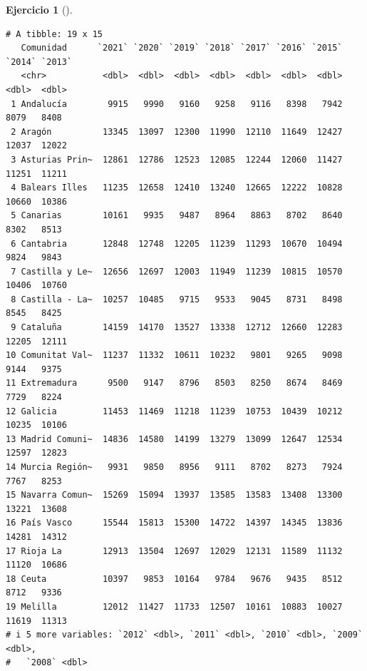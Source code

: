 \documentclass[
  a4paper,
]{scrreport}
\theoremstyle{definition}
\newtheorem{exercise}{Ejercicio}[chapter]
\theoremstyle{remark}
\begin{document}
\begin{exercise}[]
\begin{enumerate}
\begin{tcolorbox}
\begin{verbatim}
# A tibble: 19 x 15
   Comunidad      `2021` `2020` `2019` `2018` `2017` `2016` `2015` `2014` `2013`
   <chr>           <dbl>  <dbl>  <dbl>  <dbl>  <dbl>  <dbl>  <dbl>  <dbl>  <dbl>
 1 Andalucía        9915   9990   9160   9258   9116   8398   7942   8079   8408
 2 Aragón          13345  13097  12300  11990  12110  11649  12427  12037  12022
 3 Asturias Prin~  12861  12786  12523  12085  12244  12060  11427  11251  11211
 4 Balears Illes   11235  12658  12410  13240  12665  12222  10828  10660  10386
 5 Canarias        10161   9935   9487   8964   8863   8702   8640   8302   8513
 6 Cantabria       12848  12748  12205  11239  11293  10670  10494   9824   9843
 7 Castilla y Le~  12656  12697  12003  11949  11239  10815  10570  10406  10760
 8 Castilla - La~  10257  10485   9715   9533   9045   8731   8498   8545   8425
 9 Cataluña        14159  14170  13527  13338  12712  12660  12283  12205  12111
10 Comunitat Val~  11237  11332  10611  10232   9801   9265   9098   9144   9375
11 Extremadura      9500   9147   8796   8503   8250   8674   8469   7729   8224
12 Galicia         11453  11469  11218  11239  10753  10439  10212  10235  10106
13 Madrid Comuni~  14836  14580  14199  13279  13099  12647  12534  12597  12823
14 Murcia Región~   9931   9850   8956   9111   8702   8273   7924   7767   8253
15 Navarra Comun~  15269  15094  13937  13585  13583  13408  13300  13221  13608
16 País Vasco      15544  15813  15300  14722  14397  14345  13836  14281  14312
17 Rioja La        12913  13504  12697  12029  12131  11589  11132  11120  10686
18 Ceuta           10397   9853  10164   9784   9676   9435   8512   8712   9336
19 Melilla         12012  11427  11733  12507  10161  10883  10027  11619  11313
# i 5 more variables: `2012` <dbl>, `2011` <dbl>, `2010` <dbl>, `2009` <dbl>,
#   `2008` <dbl>
\end{verbatim}


\end{tcolorbox}
\end{enumerate}
\end{exercise}
\end{document}
